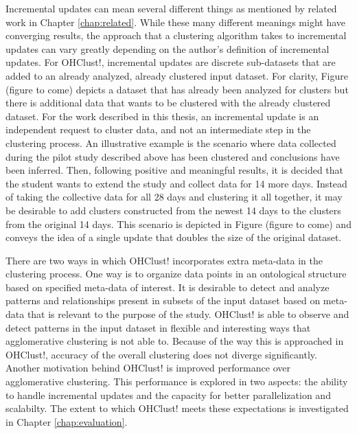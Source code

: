 \documentclass[12pt]{ucthesis}
\begin{document}
      Incremental updates can mean several different things as mentioned by
      related work in Chapter \ref{chap:related}. While these many different
      meanings might have converging results, the approach that a clustering
      algorithm takes to incremental updates can vary greatly depending on the
      author's definition of incremental updates. For \textsf{OHClust!},
      incremental updates are discrete sub-datasets that are added to an
      already analyzed, already clustered input dataset. For clarity, Figure
      (figure to come) depicts a dataset that has already been analyzed for
      clusters but there is additional data that wants to be clustered with the
      already clustered dataset. For the work described in this thesis, an
      incremental update is an independent request to cluster data, and not an
      intermediate step in the clustering process. An illustrative example is
      the scenario where data collected during the pilot study described above
      has been clustered and conclusions have been inferred. Then, following
      positive and meaningful results, it is decided that the student wants to
      extend the study and collect data for 14 more days. Instead of taking the
      collective data for all 28 days and clustering it all together, it may be
      desirable to add clusters constructed from the newest 14 days to the
      clusters from the original 14 days. This scenario is depicted in Figure
      (figure to come) and conveys the idea of a single update that doubles the
      size of the original dataset. 

      There are two ways in which \textsf{OHClust!} incorporates extra meta-data
      in the clustering process. One way is to organize data points in an
      ontological structure based on specified meta-data of interest. It is
      desirable to detect and analyze patterns and relationships present in
      subsets of the input dataset based on meta-data that is relevant to the
      purpose of the study. \textsf{OHClust!} is able to observe and detect
      patterns in the input dataset in flexible and interesting ways that
      \textsf{agglomerative clustering} is not able to. Because of the way this
      is approached in \textsf{OHClust!}, accuracy of the overall clustering does
      not diverge significantly. Another motivation behind \textsf{OHClust!} is
      improved performance over \textsf{agglomerative clustering}. This performance is
      explored in two aspects: the ability to handle incremental updates and the
      capacity for better parallelization and scalabilty. The extent to which
      \textsf{OHClust!} meets these expectations is investigated in Chapter
      \ref{chap:evaluation}.
\end{document}
